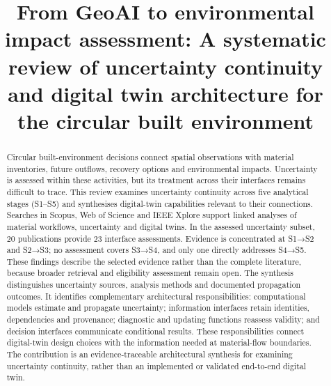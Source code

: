 \documentclass[preprint,11pt,authoryear]{elsarticle}
\begin{document}
\begin{frontmatter}
\title{From GeoAI to environmental impact assessment: A systematic review of uncertainty continuity and digital twin architecture for the circular built environment}
\begin{abstract}
Circular built-environment decisions connect spatial observations with material inventories, future outflows, recovery options and environmental impacts. Uncertainty is assessed within these activities, but its treatment across their interfaces remains difficult to trace. This review examines uncertainty continuity across five analytical stages (S1–S5) and synthesises digital-twin capabilities relevant to their connections. Searches in Scopus, Web of Science and IEEE Xplore support linked analyses of material workflows, uncertainty and digital twins. In the assessed uncertainty subset, 20 publications provide 23 interface assessments. Evidence is concentrated at S1→S2 and S2→S3; no assessment covers S3→S4, and only one directly addresses S4→S5. These findings describe the selected evidence rather than the complete literature, because broader retrieval and eligibility assessment remain open. The synthesis distinguishes uncertainty sources, analysis methods and documented propagation outcomes. It identifies complementary architectural responsibilities: computational models estimate and propagate uncertainty; information interfaces retain identities, dependencies and provenance; diagnostic and updating functions reassess validity; and decision interfaces communicate conditional results. These responsibilities connect digital-twin design choices with the information needed at material-flow boundaries. The contribution is an evidence-traceable architectural synthesis for examining uncertainty continuity, rather than an implemented or validated end-to-end digital twin.
\end{abstract}
\end{frontmatter}

\end{document}
